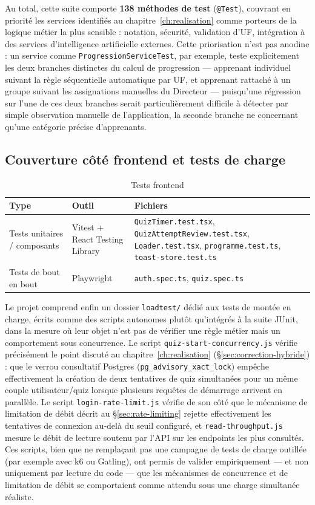 Au total, cette suite comporte \textbf{138 méthodes de test}
(\texttt{@Test}), couvrant en priorité les services identifiés au
chapitre~\ref{ch:realisation} comme porteurs de la logique métier la plus
sensible : notation, sécurité, validation d'UF, intégration à des services
d'intelligence artificielle externes. Cette priorisation n'est pas
anodine : un service comme \texttt{ProgressionServiceTest}, par exemple,
teste explicitement les deux branches distinctes du calcul de
progression --- apprenant individuel suivant la règle séquentielle
automatique par UF, et apprenant rattaché à un groupe suivant les
assignations manuelles du Directeur --- puisqu'une régression sur l'une de
ces deux branches serait particulièrement difficile à détecter par simple
observation manuelle de l'application, la seconde branche ne concernant
qu'une catégorie précise d'apprenants.

\subsection{Couverture côté frontend et tests de charge}

\begin{table}[H]
  \centering
  \caption{Tests frontend}
  \label{tab:tests-frontend}
  \begin{tabular}{@{}lll@{}}
    \toprule
    Type & Outil & Fichiers \\
    \midrule
    Tests unitaires / composants & Vitest + React Testing Library &
      \texttt{QuizTimer.test.tsx}, \texttt{QuizAttemptReview.test.tsx},
      \texttt{Loader.test.tsx}, \texttt{programme.test.ts},
      \texttt{toast-store.test.ts} \\
    Tests de bout en bout & Playwright & \texttt{auth.spec.ts}, \texttt{quiz.spec.ts} \\
    \bottomrule
  \end{tabular}
\end{table}

Le projet comprend enfin un dossier \texttt{loadtest/} dédié aux tests de
montée en charge, écrits comme des scripts autonomes plutôt qu'intégrés à
la suite JUnit, dans la mesure où leur objet n'est pas de vérifier une
règle métier mais un comportement sous concurrence. Le script
\texttt{quiz-start-concurrency.js} vérifie précisément le point discuté au
chapitre~\ref{ch:realisation} (\S\ref{sec:correction-hybride}) : que le
verrou consultatif Postgres (\texttt{pg\_advisory\_xact\_lock}) empêche
effectivement la création de deux tentatives de quiz simultanées pour un
même couple utilisateur/quiz lorsque plusieurs requêtes de démarrage
arrivent en parallèle. Le script \texttt{login-rate-limit.js} vérifie de
son côté que le mécanisme de limitation de débit décrit au
\S\ref{sec:rate-limiting} rejette effectivement les tentatives de
connexion au-delà du seuil configuré, et \texttt{read-throughput.js} mesure
le débit de lecture soutenu par l'API sur les endpoints les plus
consultés. Ces scripts, bien que ne remplaçant pas une campagne de tests
de charge outillée (par exemple avec k6 ou Gatling), ont permis de valider
empiriquement --- et non uniquement par lecture du code --- que les
mécanismes de concurrence et de limitation de débit se comportaient
comme attendu sous une charge simultanée réaliste.


